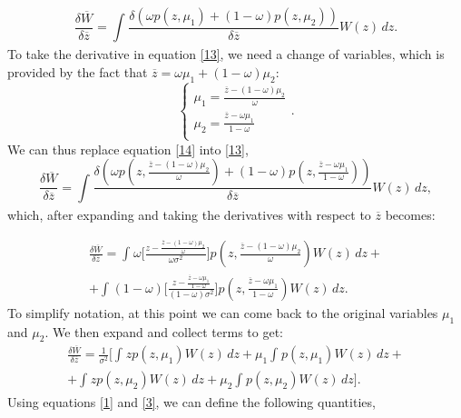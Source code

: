 \documentclass[a4paper]{article}
\begin{document}
\begin{equation}\label{13}
\frac{\delta \overline{W}}{\delta \overline{z}}=\int_{} \frac{\delta (\omega p(z,\mu_{1})+(1-\omega)p(z,\mu_{2}))}{\delta \overline{z}}W(z)\,dz.
\end{equation}
To take the derivative in equation \ref{13}, we need a change of variables, which is provided by the fact that $\overline{z}=\omega \mu_{1}+(1-\omega)\mu_{2}$:
\begin{equation} \label{14}
	\begin{cases} 
		\mu_{1}=\frac{\overline{z}-(1-\omega)\mu_{2}}{\omega}\\
		\mu_{2}=\frac{\overline{z}-\omega\mu_{1}}{1-\omega}\\
	\end{cases}.
\end{equation}
We can thus replace equation \ref{14} into \ref{13},
\begin{equation}\label{15}
\frac{\delta \overline{W}}{\delta \overline{z}}=\int_{} \frac{\delta (\omega p(z,\frac{\overline{z}-(1-\omega)\mu_{2}}{\omega})+(1-\omega)p(z,\frac{\overline{z}-\omega\mu_{1}}{1-\omega}))}{\delta \overline{z}}W(z)\,dz,
\end{equation} 
which, after expanding and taking the derivatives with respect to $\overline{z}$ becomes:

\begin{multline}\label{16}
\frac{\delta \overline{W}}{\delta \overline{z}}=\int_{} \omega\Bigg[\frac{z-\frac{\overline{z}-(1-\omega)\mu_{2}}{\omega}}{\omega \sigma^{2}}\Bigg] p(z,\frac{\overline{z}-(1-\omega)\mu_{2}}{\omega})W(z)\,dz + \\ + \int_{} (1-\omega)\Bigg[\frac{z-\frac{\overline{z}-\omega\mu_{1}}{1-\omega}}{(1-\omega) \sigma^{2}}\Bigg] p(z,\frac{\overline{z}-\omega\mu_{1}}{1-\omega})W(z)\,dz.
\end{multline}
To simplify notation, at this point we can come back to the original variables $\mu_{1}$ and $\mu_{2}$. We then expand and collect terms to get:
\begin{multline}\label{17}
\frac{\delta \overline{W}}{\delta \overline{z}}=\frac{1}{\sigma^{2}}\Bigg[\int_{}zp(z,\mu_{1})W(z)\,dz + \mu_{1}\int_{}p(z,\mu_{1})W(z)\,dz + \\ + \int_{}zp(z,\mu_{2})W(z)\,dz + \mu_{2}\int_{}p(z,\mu_{2})W(z)\,dz\Bigg].
\end{multline}
Using equations \ref{1} and \ref{3}, we can define the following quantities,
\end{document}
